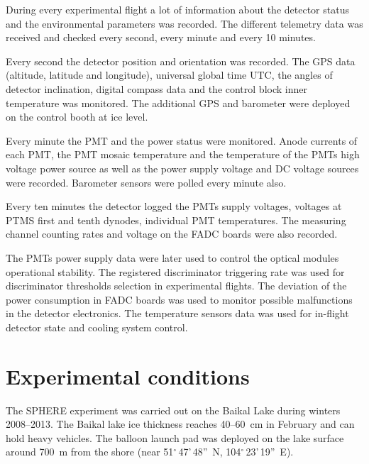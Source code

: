 \documentclass[final,5p,times,twocolumn]{elsarticle}
\begin{document}
During every experimental flight a lot of information about the detector status and the environmental parameters was recorded. The different telemetry data was received and checked every second, every minute and every 10 minutes. 

Every second the detector position and orientation was recorded. The GPS data (altitude, latitude and longitude), universal global time UTC, the angles of detector inclination, digital compass data and the control block inner temperature was monitored. The additional GPS and barometer were deployed on the control booth at ice level.

Every minute the PMT and the power status were monitored. Anode currents of each PMT, the PMT mosaic temperature and the temperature of the PMTs high voltage power source as well as the power supply voltage and DC voltage sources were recorded. Barometer sensors were polled every minute also.

Every ten minutes the detector logged the PMTs supply voltages, voltages at PTMS first and tenth dynodes, individual PMT temperatures. The measuring channel counting rates and voltage on the FADC boards were also recorded.

The PMTs power supply data were later used to control the optical modules operational stability. The registered discriminator triggering rate was used for discriminator thresholds selection in experimental flights. The deviation of the power consumption in FADC boards was used to monitor possible malfunctions in the detector electronics. The temperature sensors data was used for in-flight detector state and cooling system control.

\section{Experimental conditions}
\label{sect:data}
 
The SPHERE experiment was carried out on the Baikal Lake during winters 2008--2013. The Baikal lake ice thickness reaches 40--60~cm in February and can hold heavy vehicles. The balloon launch pad was deployed on the lake surface around 700~m from the shore (near 51$^\circ$\,47'\,48''~N, 104$^\circ$\,23'\,19''~E).
\end{document}

